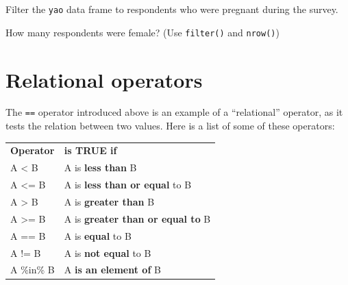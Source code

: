 \documentclass[
  letterpaper,
  DIV=11,
  numbers=noendperiod]{scrreprt}
\begin{document}
\begin{tcolorbox}[enhanced jigsaw, colframe=quarto-callout-tip-color-frame, rightrule=.15mm, opacityback=0, breakable, coltitle=black, colbacktitle=quarto-callout-tip-color!10!white, bottomrule=.15mm, leftrule=.75mm, toprule=.15mm, arc=.35mm, bottomtitle=1mm, colback=white, left=2mm, opacitybacktitle=0.6, titlerule=0mm, title=\textcolor{quarto-callout-tip-color}{\faLightbulb}\hspace{0.5em}{Practice}, toptitle=1mm]

Filter the \texttt{yao} data frame to respondents who were pregnant
during the survey.

How many respondents were female? (Use \texttt{filter()} and
\texttt{nrow()})

\end{tcolorbox}

\hypertarget{relational-operators}{%
\section{Relational operators}\label{relational-operators}}

The \texttt{==} operator introduced above is an example of a
``relational'' operator, as it tests the relation between two values.
Here is a list of some of these operators:

\begin{longtable}[]{@{}ll@{}}
\toprule\noalign{}
\endhead
\bottomrule\noalign{}
\endlastfoot
\textbf{Operator} & \textbf{is TRUE if} \\
A \textless{} B & A is \textbf{less than} B \\
A \textless= B & A is \textbf{less than or equal} to B \\
A \textgreater{} B & A is \textbf{greater than} B \\
A \textgreater= B & A is \textbf{greater than or equal to} B \\
A == B & A is \textbf{equal} to B \\
A != B & A is \textbf{not equal} to B \\
A \%in\% B & A \textbf{is an element of} B \\
\end{longtable}
\end{document}
